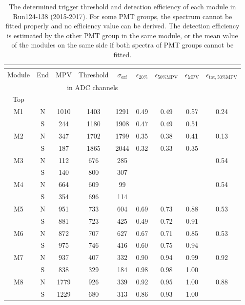 \small
\begin{longtable}{c c c c c c c c c}
  \caption{The determined trigger threshold and detection efficiency of each module in Run124-138 (2015-2017).  For some PMT groups, the spectrum cannot be fitted properly and no efficiency value can be derived. The detection efficiency is estimated by the other PMT group in the same module, or the mean value of the modules on the same side if both spectra of PMT groups cannot be fitted.} \\
  \label{tab:mpv-full}\\
  \toprule
  Module & End & MPV & Threshold & $\sigma{}_{\mathrm{erf}}$ & $\epsilon_{20\%}$ & $\epsilon_{50\%\mathrm{MPV}}$ & $\epsilon_{\mathrm{MPV}}$ & $\epsilon_{\mathrm{tot}, 50\%\mathrm{MPV}}$ \\
         &     & \multicolumn{3}{|c|}{in ADC channels} &   \\
  \midrule
  \endfirsthead
  Top\\
  \midrule
  M1 & N & 1010 & 1403 & 1291 & 0.49 & 0.49 & 0.57 & \multirow{2}{*}{0.24}\\
     & S & 244 & 1180 & 1908 & 0.47 & 0.49 & 0.51 & \\
  M2 & N & 347 & 1702 & 1799 & 0.35 & 0.38 & 0.41 & \multirow{2}{*}{0.13}\\
     & S & 187 & 1865 & 2044 & 0.32 & 0.33 & 0.35 &\\
  M3 & N & 112 & 676 & 285 &  &  &  & \multirow{2}{*}{0.54}\\
     & S & 140 & 800 & 307 &  &  &  & \\
  M4 & N & 664 & 609 & 99  &  &  & & \multirow{2}{*}{0.54}\\
     & S & 354 & 696 & 114 &  &  & & \\
  M5 & N & 951 & 733 & 604 & 0.69 & 0.73 & 0.88 & \multirow{2}{*}{0.53}\\
     & S & 881 & 723 & 425 & 0.49 & 0.72 & 0.91 &\\
  M6 & N & 872 & 707 & 627 & 0.67 & 0.71 & 0.85 & \multirow{2}{*}{0.53}\\
     & S & 975 & 746 & 416 & 0.60 & 0.75 & 0.94 &\\
  M7 & N & 937 & 407 & 332 & 0.90 & 0.94 & 0.99 & \multirow{2}{*}{0.92}\\
     & S & 838 & 329 & 184 & 0.98 & 0.98 & 1.00 & \\
  M8 & N & 1779 & 926 & 339 & 0.92 & 0.95 & 1.00 & \multirow{2}{*}{0.88}\\
     & S & 1229 & 680 & 313 & 0.86 & 0.93 & 1.00 &\\

\end{longtable}
